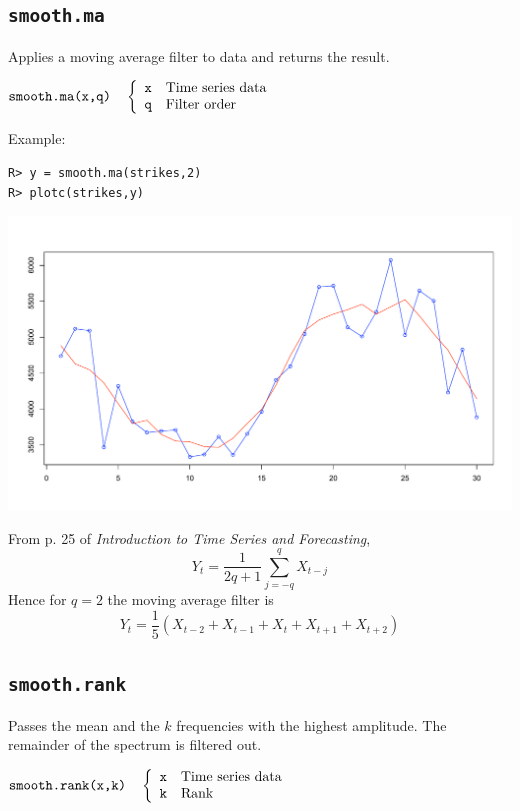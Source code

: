 \documentclass[11pt]{article}
\begin{document}
\newpage

\subsection{\tt smooth.ma}
Applies a moving average filter to data and returns the result.

\bigskip
$
\hbox{\tt smooth.ma(x,q)}\quad\left\{\begin{array}{ll}
{\tt x} & \hbox{Time series data}\\
{\tt q} & \hbox{Filter order}
\end{array}\right.
$

\bigskip
\noindent
Example:

\begin{verbatim}
R> y = smooth.ma(strikes,2)
R> plotc(strikes,y)
\end{verbatim}

\begin{center}
\includegraphics[scale=0.3]{Rplot-10.pdf}
\end{center}

\bigskip
\noindent
From p. 25 of {\it Introduction to Time Series and Forecasting},
\[
Y_t=\frac{1}{2q+1}\sum_{j=-q}^qX_{t-j}
\]
Hence for $q=2$ the moving average filter is
\[
Y_t=\frac{1}{5}(X_{t-2}+X_{t-1}+X_t+X_{t+1}+X_{t+2})
\]

\newpage

\subsection{\tt smooth.rank}
Passes the mean and the $k$ frequencies
with the highest amplitude.
The remainder of the spectrum is filtered out.

\bigskip
$
\hbox{\tt smooth.rank(x,k)}\quad\left\{
\begin{array}{ll}
{\tt x} & \hbox{Time series data}\\
{\tt k} & \hbox{Rank}
\end{array}\right.
$
\end{document}
